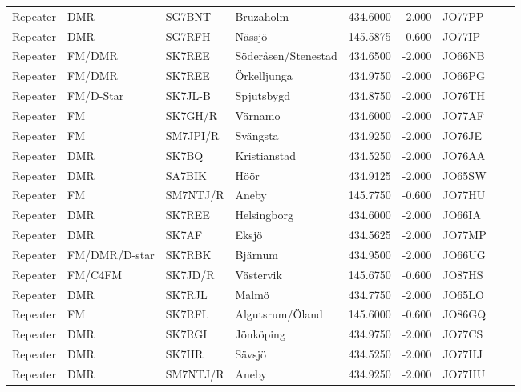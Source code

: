 \begin{longtable}{llllrrlcl}
	Repeater & DMR             & SG7BNT   & Bruzaholm               &   434.6000 &   -2.000 & JO77PP &  \\
	Repeater & DMR             & SG7RFH   & Nässjö                  &   145.5875 &   -0.600 & JO77IP &  \\
	Repeater & FM/DMR          & SK7REE   & Söderåsen/Stenestad     &   434.6500 &   -2.000 & JO66NB &  \\
	Repeater & FM/DMR          & SK7REE   & Örkelljunga             &   434.9750 &   -2.000 & JO66PG &  \\
	Repeater & FM/D-Star       & SK7JL-B  & Spjutsbygd              &   434.8750 &   -2.000 & JO76TH &  \\
	Repeater & FM              & SK7GH/R  & Värnamo                 &   434.6000 &   -2.000 & JO77AF &  \\
	Repeater & FM              & SM7JPI/R & Svängsta                &   434.9250 &   -2.000 & JO76JE &  \\
	Repeater & DMR             & SK7BQ    & Kristianstad            &   434.5250 &   -2.000 & JO76AA &  \\
	Repeater & DMR             & SA7BIK   & Höör                    &   434.9125 &   -2.000 & JO65SW &  \\
	Repeater & FM              & SM7NTJ/R & Aneby                   &   145.7750 &   -0.600 & JO77HU &  \\
	Repeater & DMR             & SK7REE   & Helsingborg             &   434.6000 &   -2.000 & JO66IA &  \\
	Repeater & DMR             & SK7AF    & Eksjö                   &   434.5625 &   -2.000 & JO77MP &  \\
	Repeater & FM/DMR/D-star   & SK7RBK   & Bjärnum                 &   434.9500 &   -2.000 & JO66UG &  \\
	Repeater & FM/C4FM         & SK7JD/R  & Västervik               &   145.6750 &   -0.600 & JO87HS &  \\
	Repeater & DMR             & SK7RJL   & Malmö                   &   434.7750 &   -2.000 & JO65LO &  \\
	Repeater & FM              & SK7RFL   & Algutsrum/Öland         &   145.6000 &   -0.600 & JO86GQ &  \\
	Repeater & DMR             & SK7RGI   & Jönköping               &   434.9750 &   -2.000 & JO77CS &  \\
	Repeater & DMR             & SK7HR    & Sävsjö                  &   434.5250 &   -2.000 & JO77HJ &  \\
	Repeater & DMR             & SM7NTJ/R & Aneby                   &   434.9250 &   -2.000 & JO77HU &  \\

\end{longtable}
